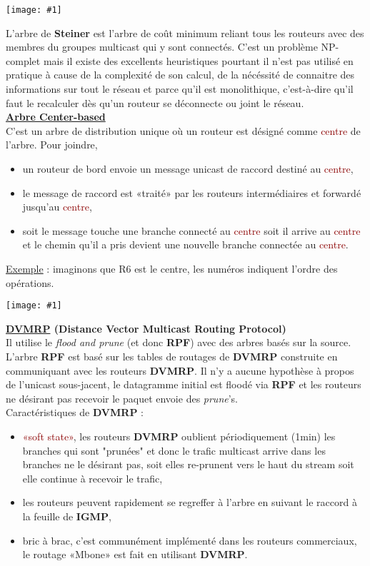 \documentclass{article}
\newcommand{\red}[1]{\textcolor{darkred}{#1}}
\newcommand{\imgR}[2]{\begin{center}\texttt{[image: \#1]}\end{center}}
\begin{document}
\imgR{CN_101.png}{100}

\noindent L'arbre de \textbf{Steiner} est l'arbre de coût minimum reliant tous les routeurs avec des membres du 
groupes multicast qui y sont connectés. C'est un problème NP-complet mais il existe des excellents heuristiques 
pourtant il n'est pas utilisé en pratique à cause de la complexité de son calcul, de la nécéssité de connaitre 
des informations sur tout le réseau et parce qu'il est monolithique, c'est-à-dire qu'il faut le recalculer dès 
qu'un routeur se déconnecte ou joint le réseau. \\

\noindent\textbf{\underline{Arbre Center-based}} \\

\noindent C'est un arbre de distribution unique où un routeur est désigné comme \red{centre} de l'arbre. Pour 
joindre,
\begin{itemize}
\item un routeur de bord envoie un message unicast de raccord destiné au \red{centre},
\item le message de raccord est «traité» par les routeurs intermédiaires et forwardé jusqu'au \red{centre},
\item soit le message touche une branche connecté au \red{centre} soit il arrive au \red{centre} et le chemin 
qu'il a pris devient une nouvelle branche connectée au \red{centre}.
\end{itemize}

\underline{Exemple} : imaginons que R6 est le centre, les numéros indiquent l'ordre des opérations.

\imgR{CN_102.png}{100}

\noindent\textbf{\underline{DVMRP} (Distance Vector Multicast Routing Protocol)} \\

Il utilise le \textit{flood and prune} (et donc \textbf{RPF}) avec des arbres basés sur la source. L'arbre 
\textbf{RPF} est basé sur les tables de routages de \textbf{DVMRP} construite en communiquant avec les routeurs 
\textbf{DVMRP}. Il n'y a aucune hypothèse à propos de l'unicast sous-jacent, le datagramme initial est floodé via
\textbf{RPF} et les routeurs ne désirant pas recevoir le paquet envoie des \textit{prune}'s. \\
Caractéristiques de \textbf{DVMRP} : 
\begin{itemize}
\item \red{«soft state»}, les routeurs \textbf{DVMRP} oublient périodiquement (1min) les branches qui sont 
"prunées" et donc le trafic multicast arrive dans les branches ne le désirant pas, soit elles re-prunent vers le
haut du stream soit elle continue à recevoir le trafic,
\item les routeurs peuvent rapidement se regreffer à l'arbre en suivant le raccord à la feuille de \textbf{IGMP},
\item bric à brac, c'est communément implémenté dans les routeurs commerciaux, le routage «Mbone» est fait en 
utilisant \textbf{DVMRP}.
\end{itemize}
\end{document}
